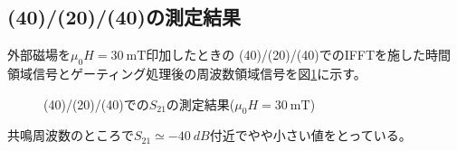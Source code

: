 \documentclass[dvipdfmx,11pt]{jsreport}
\numberwithin{equation}{chapter}
\numberwithin{table}{chapter}
\begin{document}
\subsection{(40)/(20)/(40)の測定結果}
外部磁場を$\mu_0 H=\SI{30}{\milli \tesla}$印加したときの
(40)/(20)/(40)でのIFFTを施した時間領域信号とゲーティング処理後の周波数領域信号を図\ref{fig:k1}に示す。
\begin{figure}[H]
	\centering
    \caption{(40)/(20)/(40)での$S_{21}$の測定結果($\mu_0 H=\SI{30}{\milli \tesla}$)}
    \label{fig:k1}
\end{figure}
共鳴周波数のところで$S_{21}\simeq \SI{-40}{dB}$付近でやや小さい値をとっている。
\end{document}

